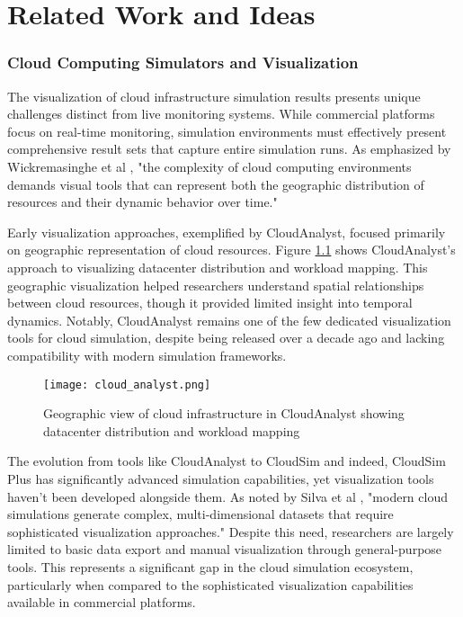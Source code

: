 \chapter{Related Work and Ideas}

\subsection{Cloud Computing Simulators and Visualization}
The visualization of cloud infrastructure simulation results presents unique challenges distinct from live monitoring systems. While commercial platforms focus on real-time monitoring, simulation environments must effectively present comprehensive result sets that capture entire simulation runs. As emphasized by Wickremasinghe et al \cite{wickremasinghe2010cloudanalyst}, "the complexity of cloud computing environments demands visual tools that can represent both the geographic distribution of resources and their dynamic behavior over time."

Early visualization approaches, exemplified by CloudAnalyst, focused primarily on geographic representation of cloud resources. Figure \ref{fig:cloudanalyst} shows CloudAnalyst's approach to visualizing datacenter distribution and workload mapping. This geographic visualization helped researchers understand spatial relationships between cloud resources, though it provided limited insight into temporal dynamics. Notably, CloudAnalyst remains one of the few dedicated visualization tools for cloud simulation, despite being released over a decade ago and lacking compatibility with modern simulation frameworks.

\begin{figure}[h]
\texttt{[image: cloud\_analyst.png]}
\caption{Geographic view of cloud infrastructure in CloudAnalyst showing datacenter distribution and workload mapping}
\label{fig:cloudanalyst}
\end{figure}

The evolution from tools like CloudAnalyst to CloudSim and indeed, CloudSim Plus has significantly advanced simulation capabilities, yet visualization tools haven't been developed alongside them. As noted by Silva et al \cite{silva2020cloudsim}, "modern cloud simulations generate complex, multi-dimensional datasets that require sophisticated visualization approaches." Despite this need, researchers are largely limited to basic data export and manual visualization through general-purpose tools. This represents a significant gap in the cloud simulation ecosystem, particularly when compared to the sophisticated visualization capabilities available in commercial platforms.

